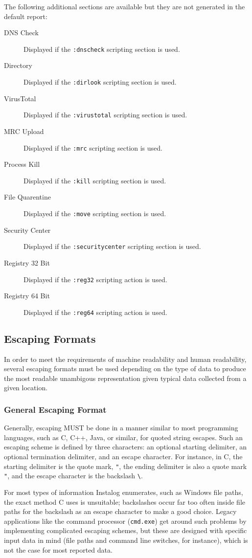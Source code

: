 \documentclass[letterpaper,12pt]{article}
\begin{document}
\noindent{}The following additional sections are available but they are not
generated in the default report:
\begin{description}
\item[DNS Check] Displayed if the \verb|:dnscheck| scripting section is used.
\item[Directory] Displayed if the \verb|:dirlook| scripting section is used.
\item[VirusTotal] Displayed if the \verb|:virustotal| scripting section is used.
\item[MRC Upload] Displayed if the \verb|:mrc| scripting section is used.
\item[Process Kill] Displayed if the \verb|:kill| scripting section is used.
\item[File Quarentine] Displayed if the \verb|:move| scripting section is used.
\item[Security Center] Displayed if the \verb|:securitycenter| scripting section
is used.
\item[Registry 32 Bit] Displayed if the \verb|:reg32| scripting action is used.
\item[Registry 64 Bit] Displayed if the \verb|:reg64| scripting action is used.
\end{description}

\subsection{Escaping Formats}
In order to meet the requirements of machine readability and human readability,
several escaping formats must be used depending on the type of data to produce
the most readable unambigous representation given typical data collected from a
given location.

\subsubsection{General Escaping Format}
Generally, escaping MUST be done in a manner similar to most programming
languages, such as C, C++, Java, or similar, for quoted string escapes. Such an
escaping scheme is defined by three characters: an optional starting delimiter,
an optional termination delimiter, and an escape character. For instance, in C,
the starting delimiter is the quote mark, \verb|"|, the ending delimiter is also a quote
mark \verb|"|, and the escape character is the backslash \verb|\|.

For most types of information Instalog enumerates, such as Windows file paths,
the exact method C uses is unsuitable; backslashes occur far too often inside
file paths for the backslash as an escape character to make a good choice.
Legacy applications like the command processor (\texttt{cmd.exe}) get around
such problems by implementing complicated escaping schemes, but these are
designed with specific input data in mind (file paths and command line
switches, for instance), which is not the case for most reported data.
\end{document}
